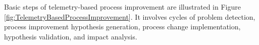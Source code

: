 %
%	
%	
%	
%
%

Basic steps of telemetry-based process improvement are illustrated in Figure \ref{fig:TelemetryBasedProcessImprovement}. It involves cycles of problem detection, process improvement hypothesis generation, process change implementation, hypothesis validation, and impact analysis.

